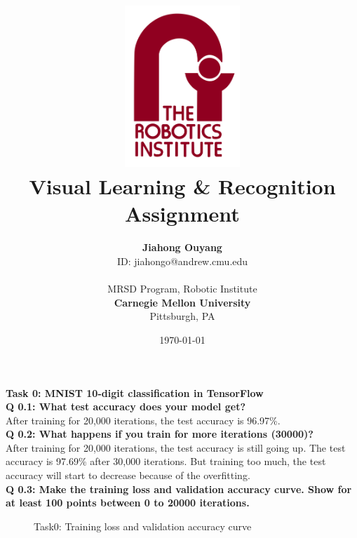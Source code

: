 \documentclass[12pt]{report}
\title{
\includegraphics[width=1.7in]{RI_Logo.png} \\
\vspace*{1in}
\textbf{Visual Learning \& Recognition Assignment \uppercase\expandafter{\romannumeral1}}}
\author{\textbf{Jiahong Ouyang} \\
	ID: jiahongo@andrew.cmu.edu\\
		\vspace*{0.5in} \\
		MRSD Program, Robotic Institute\\
        \textbf{Carnegie Mellon University}\\
        Pittsburgh, PA
       } \date{\today}
\begin{document}
\maketitle
\begin{outline}

\item \textbf{Task 0:  MNIST 10-digit classification in TensorFlow}\\
\textbf{Q 0.1: What test accuracy does your model get?}\\
After training for 20,000 iterations, the test accuracy is 96.97\%.\\

\textbf{Q 0.2: What happens if you train for more iterations (30000)?}\\
After training for 20,000 iterations, the test accuracy is still going up. The test accuracy is 97.69\% after 30,000 iterations. But training too much, the test accuracy will start to decrease because of the overfitting.\\

\textbf{Q 0.3: Make the training loss and validation accuracy curve. Show for at least 100 points between 0 to 20000 iterations.}

\begin{figure}[!h]
  \centering
  \caption{Task0: Training loss and validation accuracy curve}
\label{fig:short}
\end{figure}


\end{outline}
\end{document}
